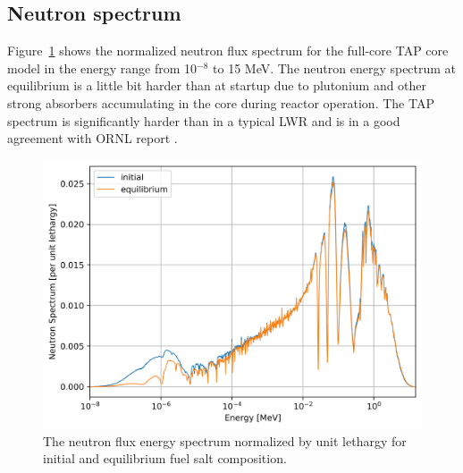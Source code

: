 \documentclass[12pt]{article} %
\begin{document}
\subsection{Neutron spectrum}
Figure~\ref{fig:spectrum} shows the normalized neutron flux spectrum for the 
full-core \gls{TAP} core model in the energy range from 10$^{-8}$ to 15 MeV. 
The neutron energy spectrum at equilibrium is a little bit harder than at 
startup due to plutonium and other strong absorbers accumulating in the 
core during reactor operation. The \gls{TAP} spectrum is significantly 
harder than in a typical \gls{LWR} and is in a good agreement with 
\gls{ORNL} report \cite{betzler_assessment_2017}.
\begin{figure}[htp!] %
  \centering
		  \includegraphics[width=\textwidth]{spectrum.png}
	 \vspace{-0.35in}
  \caption{The neutron flux energy spectrum normalized by unit lethargy 
  for initial and equilibrium fuel salt composition.}
  \label{fig:spectrum}
\end{figure}
\end{document}
